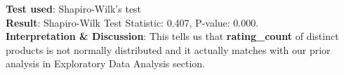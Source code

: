 \documentclass[a4paper,12pt]{article}
\begin{document}
\noindent\textbf{Test used}: Shapiro-Wilk's test \\ 

\noindent\textbf{Result}: Shapiro-Wilk Test Statistic: 0.407, P-value: 0.000. \\ 

\noindent\textbf{Interpretation \& Discussion}: This tells us that \textbf{rating\_count} of distinct products is not normally distributed and it actually matches with our prior analysis in Exploratory Data Analysis section.\\ 

\end{document}
